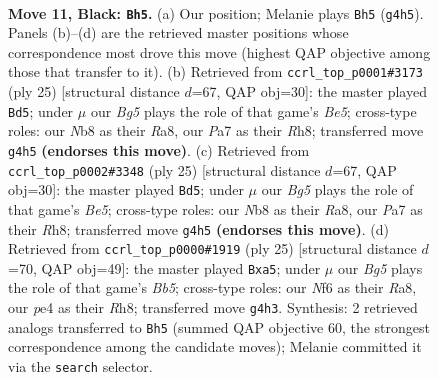\documentclass[11pt]{article}
\begin{document}
\clearpage

\begin{figure}[p]\centering
\begin{subfigure}{0.46\textwidth}\centering
\resizebox{\linewidth}{!}{%
\newchessgame
\chessboard[
  setfen={rn1r2k1/pp3pbp/2p2np1/4p3/PP2P1bP/2N2N2/2P1BPP1/R1B2RK1 b - - 0 11},
  showmover=false,
  pgfstyle=straightmove, color=movearrow, markmove={g4-h5}
]}
\caption{}
\end{subfigure}\hfill
\begin{subfigure}{0.46\textwidth}\centering
\resizebox{\linewidth}{!}{%
\newchessgame
\chessboard[
  setfen={r3k2r/pp1nbpp1/2p1pn1p/8/3Pb3/1N3NP1/PP1BPPBP/R2R2K1 b kq - 1 13},
  showmover=false,
  pgfstyle=straightmove, color=movearrow, markmove={e4-d5}
]}
\caption{}
\end{subfigure}
\\[4pt]
\begin{subfigure}{0.46\textwidth}\centering
\resizebox{\linewidth}{!}{%
\newchessgame
\chessboard[
  setfen={r3k2r/pp1nbpp1/2p1pn1p/8/3Pb3/1N3NP1/PP1BPPBP/R2R2K1 b kq - 1 13},
  showmover=false,
  pgfstyle=straightmove, color=movearrow, markmove={e4-d5}
]}
\caption{}
\end{subfigure}\hfill
\begin{subfigure}{0.46\textwidth}\centering
\resizebox{\linewidth}{!}{%
\newchessgame
\chessboard[
  setfen={r3k2r/pp1n1ppp/2p1pn2/N7/1b1P4/1P3NP1/1Pb1PPBP/R1B2RK1 b kq - 4 13},
  showmover=false,
  pgfstyle=straightmove, color=movearrow, markmove={b4-a5}
]}
\caption{}
\end{subfigure}
\caption{\textbf{Move 11, Black: \texttt{Bh5}.} (a) Our position; Melanie plays \texttt{Bh5} (\texttt{g4h5}). Panels (b)--(d) are the retrieved master positions whose correspondence most drove this move (highest QAP objective among those that transfer to it). (b) Retrieved from \texttt{ccrl\_top\_p0001\#3173} (ply 25) [structural distance $d$=67, QAP obj=30]: the master played \texttt{Bd5}; under $\mu$ our \emph{Bg5} plays the role of that game's \emph{Be5}; cross-type roles: our \emph{N}b8 as their \emph{R}a8, our \emph{P}a7 as their \emph{R}h8; transferred move \texttt{g4h5} \textbf{(endorses this move)}. (c) Retrieved from \texttt{ccrl\_top\_p0002\#3348} (ply 25) [structural distance $d$=67, QAP obj=30]: the master played \texttt{Bd5}; under $\mu$ our \emph{Bg5} plays the role of that game's \emph{Be5}; cross-type roles: our \emph{N}b8 as their \emph{R}a8, our \emph{P}a7 as their \emph{R}h8; transferred move \texttt{g4h5} \textbf{(endorses this move)}. (d) Retrieved from \texttt{ccrl\_top\_p0000\#1919} (ply 25) [structural distance $d$=70, QAP obj=49]: the master played \texttt{Bxa5}; under $\mu$ our \emph{Bg5} plays the role of that game's \emph{Bb5}; cross-type roles: our \emph{N}f6 as their \emph{R}a8, our \emph{p}e4 as their \emph{R}h8; transferred move \texttt{g4h3}. Synthesis: 2 retrieved analogs transferred to \texttt{Bh5} (summed QAP objective 60, the strongest correspondence among the candidate moves); Melanie committed it via the \texttt{search} selector.}
\label{fig:thought-m21}
\end{figure}
\end{document}

